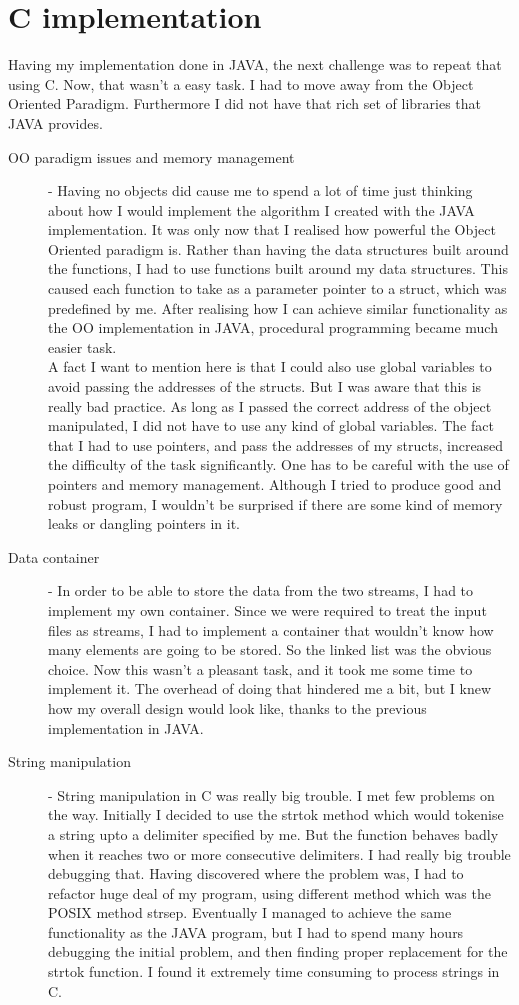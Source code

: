 \documentclass[a4paper]{article}
\begin{document}
 

\section{C implementation}

Having my implementation done in JAVA, the next challenge was to repeat that using C. Now, that wasn't a easy task. I had to move away from the Object Oriented Paradigm. Furthermore I did not have that rich set of libraries that JAVA provides.
\begin{description}
  \item[OO paradigm issues and memory management] - Having no objects did cause me to spend a lot of time just thinking about how I would implement the algorithm I created with the JAVA implementation. It was only now that I realised how powerful the Object Oriented paradigm is. Rather than having the data structures built around the functions, I had to use functions built around my data structures. This caused each function to take as a parameter pointer to a struct, which was predefined by me. After realising how I can achieve similar functionality as the OO implementation in JAVA, procedural programming became much easier task.\\ A fact I want to mention here is that I could also use global variables to avoid passing the addresses of the structs. But I was aware that this is really bad practice. As long as I passed the correct address of the object manipulated, I did not have to use any kind of global variables. The fact that I had to use pointers, and pass the addresses of my structs, increased the difficulty of the task significantly. One has to be careful with the use of pointers and memory management. Although I tried to produce good and robust program, I wouldn't be surprised if there are some kind of memory leaks or dangling pointers in it. 
  \item[Data container] - In order to be able to store the data from the two streams, I had to implement my own container. Since we were required to treat the input files as streams, I had to implement a container that wouldn't know how many elements are going to be stored. So the linked list was the obvious choice. Now this wasn't a pleasant task, and it took me some time to implement it. The overhead of doing that hindered me a bit, but I knew how my overall design would look like, thanks to the previous implementation in JAVA.
  \item[String manipulation] - String manipulation in C was really big trouble. I met few problems on the way. Initially I decided to use the strtok method which would tokenise a string upto a delimiter specified by me. But the function behaves badly when it reaches two       or more consecutive delimiters. I had really big trouble debugging that. Having discovered where the problem was, I had to refactor huge deal of my program, using different method which was the POSIX method strsep. Eventually I managed to achieve the same functionality as the JAVA program, but I had to spend many hours debugging the initial problem, and then finding proper replacement for the strtok function. I found it extremely time consuming to process strings in C.  

\end{description}
\end{document}
